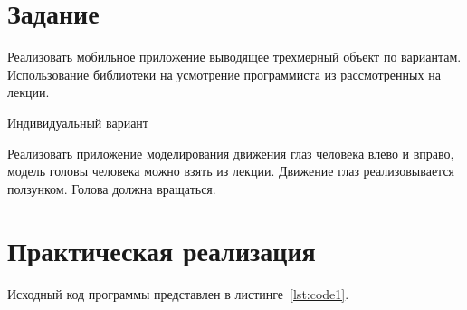 \documentclass[a4paper, 14pt]{extarticle}
\begin{document}
\renewcommand{\ttdefault}{pcr}

\setlength{\tabcolsep}{3pt}
\newpage
\setcounter{page}{2}

\section{Задание}\label{Sect::task}

Реализовать  мобильное приложение выводящее трехмерный объект по вариантам. Использование библиотеки на усмотрение программиста из рассмотренных на лекции.

Индивидуальный вариант

Реализовать приложение моделирования движения глаз человека влево и вправо, модель головы человека можно взять из лекции. Движение глаз реализовывается ползунком. Голова должна вращаться.

\section{Практическая реализация}\label{Sect::code}

Исходный код программы представлен в листинге~\ref{lst:code1}.
\end{document}
